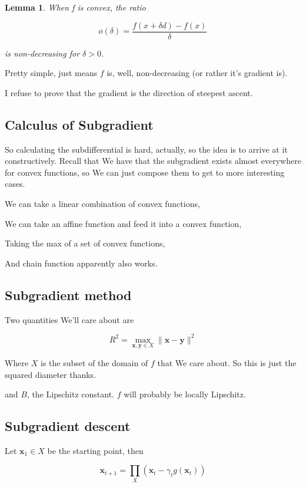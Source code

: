 \documentclass{article}
\newtheorem{lemma}[theorem]{Lemma}
\newcommand{\Emptyset}{\text{\o}}
\begin{document}
		\begin{lemma}
			When f is convex, the ratio
			
			\[ \Emptyset (\delta) =  \frac{f(x+\delta d) - f(x)}{\delta}  \]
			
			is non-decreasing for $\delta > 0$.
		\end{lemma}
		
		Pretty simple, just means $f$ is, well, non-decreasing (or rather it's gradient is).
		
		I refuse to prove that the gradient is the direction of steepest ascent.
		
	\subsection{Calculus of Subgradient}
	
		So calculating the subdifferential is hard, actually, so the idea is to arrive at it constructively. Recall that We have that the subgradient exists almost everywhere for convex functions, so We can just compose them to get to more interesting cases.
		
		We can take a linear combination of convex functions,
		
		We can take an affine function and feed it into a convex function,
		
		Taking the max of a set of convex functions,
		
		And chain function apparently also works. 
		
	\subsection{Subgradient method}
	
		Two quantities We'll care about are
		
		\[ R^2 = \max_{\mathbf{x, y}\in X} \|\mathbf{x-y}\|^2 \]
		
		Where $X$ is the subset of the domain of $f$ that We care about. So this is just the squared diameter thanks.
		
		and $B$, the Lipschitz constant. $f$ will probably be locally Lipschitz.
		
	\subsection{Subgradient descent}
	
		Let $\mathbf{x}_1 \in X$ be the starting point, then
		
		\[ \mathbf{x}_{t+1} = \prod_X(\mathbf{x}_t - \gamma_t g(\mathbf{x}_t))\]
		
\end{document}
